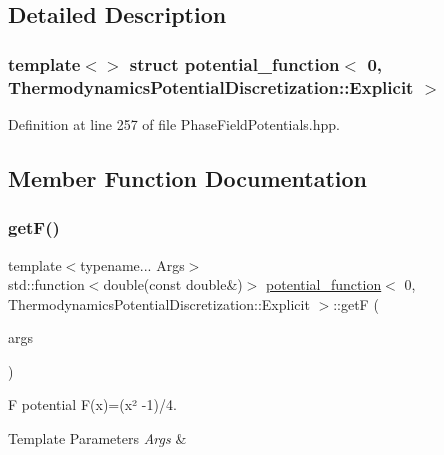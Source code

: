 \subsection{Detailed Description}
\subsubsection*{template$<$$>$\newline
struct potential\+\_\+function$<$ 0, Thermodynamics\+Potential\+Discretization\+::\+Explicit $>$}



Definition at line 257 of file Phase\+Field\+Potentials.\+hpp.



\subsection{Member Function Documentation}
\mbox{\label{structpotential__function_3_010_00_01ThermodynamicsPotentialDiscretization_1_1Explicit_01_4_ac2cb58d964d6727a364a8f7a39f57f93}} 
\subsubsection{\texorpdfstring{get\+F()}{getF()}}
{\footnotesize\ttfamily template$<$typename... Args$>$ \\
std\+::function$<$double(const double\&)$>$ \hyperlink{structpotential__function}{potential\+\_\+function}$<$ 0, Thermodynamics\+Potential\+Discretization\+::\+Explicit $>$\+::getF (\begin{DoxyParamCaption}\item[{Args...}]{args }\end{DoxyParamCaption})\hspace{0.3cm}{\ttfamily [inline]}}



F potential F(x)=(x² -\/1)/4. 


\begin{DoxyTemplParams}{Template Parameters}
{\em Args} & \\
\hline
\end{DoxyTemplParams}

